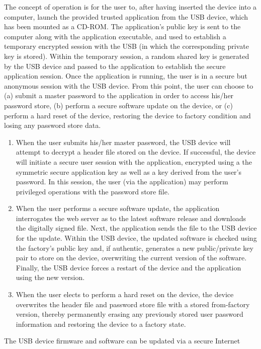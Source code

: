 The concept of operation is for the user to, after having inserted the
device into a computer, launch the provided trusted application from
the USB device, which has been mounted as a CD-ROM.  The application's
public key is sent to the computer along with the application
executable, and used to establish a temporary encrypted session with
the USB (in which the corresponding private key is stored).  Within
the temporary session, a random shared key is generated by the USB
device and passed to the application to establish the secure
application session.  Once the application is running, the user is in
a secure but anonymous session with the USB device.  From this point,
the user can choose to (a) submit a master password to the application
in order to access his/her password store, (b) perform a secure
software update on the device, or (c) perform a hard reset of the
device, restoring the device to factory condition and losing any
password store data.
\begin{enumerate}[label=(\alph*)]
    \item When the user submits his/her master password, the USB
device will attempt to decrypt a header file stored on the device.  If
successful, the device will initiate a secure user session with the
application, encrypted using a the symmetric secure application key as
well as a key derived from the user's password.  In this session, the
user (via the application) may perform privileged operations with the
password store file.
    \item When the user performs a secure software update, the
application interrogates the web server as to the latest software
release and downloads the digitally signed file.  Next, the
application sends the file to the USB device for the update.  Within
the USB device, the updated software is checked using the factory's
public key and, if authentic, generates a new public/private key pair
to store on the device, overwriting the current version of the
software.  Finally, the USB device forces a restart of the device and
the application using the new version.
    \item When the user elects to perform a hard reset on the device,
the device overwrites the header file and password store file with a
stored from-factory version, thereby permanently erasing any
previously stored user password information and restoring the device
to a factory state.
\end{enumerate}
\par The USB device firmware and software can be updated via a secure Internet
